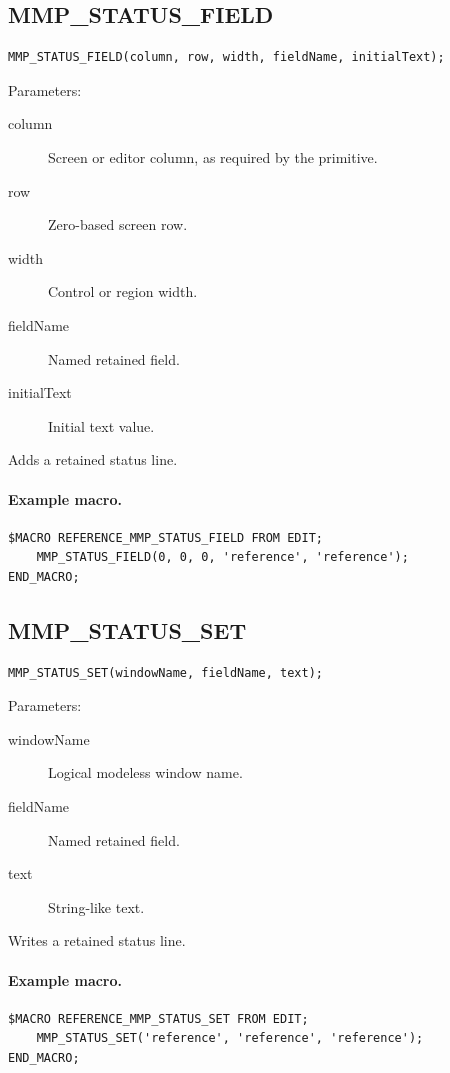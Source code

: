 \documentclass[a4paper,10pt,twoside,openany]{book}
\newenvironment{mrmacextension}{\begin{changebar}}{\end{changebar}}
\begin{document}
\begin{mrmacextension}
\label{prim:procedure-mmp-status-field}
\subsection*{MMP\_STATUS\_FIELD}
\begin{verbatim}
MMP_STATUS_FIELD(column, row, width, fieldName, initialText);
\end{verbatim}
Parameters:
\begin{description}
\item[column] Screen or editor column, as required by the primitive.
\item[row] Zero-based screen row.
\item[width] Control or region width.
\item[fieldName] Named retained field.
\item[initialText] Initial text value.
\end{description}

Adds a retained status line.

\paragraph{Example macro.}
\begin{verbatim}
$MACRO REFERENCE_MMP_STATUS_FIELD FROM EDIT;
    MMP_STATUS_FIELD(0, 0, 0, 'reference', 'reference');
END_MACRO;
\end{verbatim}
\end{mrmacextension}

\begin{mrmacextension}
\label{prim:procedure-mmp-status-set}
\subsection*{MMP\_STATUS\_SET}
\begin{verbatim}
MMP_STATUS_SET(windowName, fieldName, text);
\end{verbatim}
Parameters:
\begin{description}
\item[windowName] Logical modeless window name.
\item[fieldName] Named retained field.
\item[text] String-like text.
\end{description}

Writes a retained status line.

\paragraph{Example macro.}
\begin{verbatim}
$MACRO REFERENCE_MMP_STATUS_SET FROM EDIT;
    MMP_STATUS_SET('reference', 'reference', 'reference');
END_MACRO;
\end{verbatim}
\end{mrmacextension}
\end{document}
